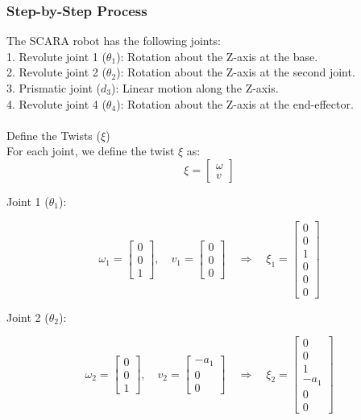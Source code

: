 \documentclass[12pt]{report}
\begin{document}
\subsubsection*{Step-by-Step Process}
The SCARA robot has the following joints:
\\1. Revolute joint 1 (\(\theta_1\)):
Rotation about the Z-axis at the base.
\\2. Revolute joint 2 (\(\theta_2\)):
Rotation about the Z-axis at the second joint.
\\3. Prismatic joint (\(d_3\)):
Linear motion along the Z-axis.
\\4. Revolute joint 4 (\(\theta_4\)):
Rotation about the Z-axis at the end-effector.
\\\\Define the Twists (\(\xi\))\\
For each joint, we define the twist \(\xi\) as:
\begin{equation*}
	\xi = 
	\begin{bmatrix}
		\omega \\
		v
	\end{bmatrix}
\end{equation*}


Joint 1 (\(\theta_1\)):

\begin{equation}
	\omega_1 = \begin{bmatrix} 0 \\ 0 \\ 1 \end{bmatrix}, \quad
	v_1 = \begin{bmatrix} 0 \\ 0 \\ 0 \end{bmatrix} \quad
	\Rightarrow \quad
	\xi_1 =
	\begin{bmatrix}
		0 \\ 0 \\ 1 \\ 0 \\ 0 \\ 0
	\end{bmatrix}
\end{equation}


Joint 2 (\(\theta_2\)):

\begin{equation}
	\omega_2 = \begin{bmatrix} 0 \\ 0 \\ 1 \end{bmatrix}, \quad
	v_2 = \begin{bmatrix} -a_1 \\ 0 \\ 0 \end{bmatrix} \quad
	\Rightarrow \quad
	\xi_2 =
	\begin{bmatrix}
		0 \\ 0 \\ 1 \\ -a_1 \\ 0 \\ 0
	\end{bmatrix}
\end{equation}
\end{document}
